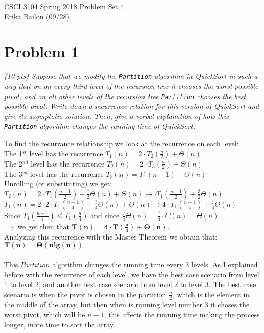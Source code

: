 \documentclass[11pt]{article} \setlength{\oddsidemargin}{0in}
\begin{document}
\noindent CSCI 3104 Spring 2018 \hfill Problem Set 4\\
Erika Bailon (09/28)

\hrulefill

{\selectfont

  \section*{Problem 1}

  \textit{(10 pts) Suppose that we modify the \texttt{Partition}
    algorithm in QuickSort in such a way that on on every third level
    of the recursion tree it chooses the worst possible pivot, and on
    all other levels of the recursion tree \texttt{Partition} chooses
    the best possible pivot.  Write down a recurrence relation for
    this version of QuickSort and give its asymptotic solution. Then,
    give a verbal explanation of how this \texttt{Partition} algorithm
    changes the running time of QuickSort.}

To find the recurrance relationship we look at the recurrence on each level:\\
The 1$^{st}$ level has the recurrence $T_1(n) = 2 \cdot T_2(\frac{n}{2}) + \Theta(n)$\\
The 2$^{nd}$ level has the recurrence $T_2(n) = 2 \cdot T_3(\frac{n}{2}) + \Theta (n)$\\
The 3$^{rd}$ level has the recurrence $T_3 (n)= T_1(n-1) + \Theta (n)$\\
Unrolling (or substituting) we get: \\
$T_2(n) = 2 \cdot T_1(\frac{n-1}{2}) + \frac{1}{2}\Theta(n) + \Theta(n) \rightarrow \cdot T_1(\frac{n-1}{2}) + \frac{3}{2}\Theta(n)$\\
$T_1(n) = 2 \cdot 2 \cdot T_1(\frac{n-1}{4}) + \frac{3}{4}\Theta(n) + \Theta(n) \rightarrow 4 \cdot T_1(\frac{n-1}{4}) + \frac{7}{4}\Theta(n)$ \\
Since $T_1(\frac{n-1}{4}) \leq T_1(\frac{n}{4})$ and since $\frac{7}{4}\Theta(n) = \frac{7}{4} \cdot C(n) = \Theta(n)$\\
$\Rightarrow$ we get then that $\mathbf{T (n)= 4 \cdot T(\frac{n}{4}) + \Theta(n)}$. \\
Analyzing this recurrence with the Master Theorem we obtain that: \\
$\mathbf{T(n) = \Theta(n lg (n))}$ \\\\
This $Partition$ algorithm changes the running time every 3 levels. As I explained before with the recurrence of each level, we have the best case scenario from level $1$ to level $2$, and another best case scenario from level $2$ to level $3$. The best case scenario is when the pivot is chosen in the partition $\frac {n}{2}$, which is the element in the middle of the array, but then when is running level number $3$ it choses the worst pivot, which will be $n-1$, this affects the running time making the process longer, more time to sort the array. 

}
\end{document}
